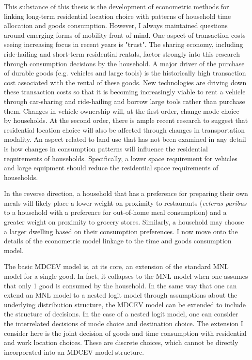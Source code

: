 This substance of this thesis is the development of econometric methods for linking long-term residential location choice with patterns of household time allocation and goods consumption. However, I always maintained questions around emerging forms of mobility front of mind. One aspect of transaction costs seeing increasing focus in recent years is "trust". The sharing economy, including ride-hailing and short-term residential rentals, factor strongly into this research through consumption decisions by the household. A major driver of the purchase of durable goods (e.g. vehicles and large tools) is the historically high transaction cost associated with the rental of these goods. New technologies are driving down these transaction costs so that it is becoming increasingly viable to rent a vehicle through car-sharing and ride-hailing and borrow large tools rather than purchase them. Changes in vehicle ownership will, at the first order, change mode choice by households. At the second order, there is ample recent research to suggest that residential location choice will also be affected through changes in transportation modality. An aspect related to land use that has not been examined in any detail is how changes in consumption patterns will influence the residential requirements of households. Specifically, a lower space requirement for vehicles and large equipment should reduce the residential space requirements of households.

In the reverse direction, a household that has a preference for preparing their own meals will likely place a lower weight on proximity to restaurants (\textit{ceterus paribus} to a household with a preference for out-of-home meal consumption) and a greater weight on proximity to grocery stores. Similarly, a household may choose a larger dwelling based on their consumption preferences. I now move onto the details of the econometric model linkage to the time and goods consumption model.

The basic MDCEV model is, at its core, an extension of the standard MNL model for a single good. In fact, it collapses to the MNL model when one assumes that only 1 good is consumed by the household. In the same way that one can extend an MNL model to a nested logit model through assumptions about the underlying distribution structure, the MDCEV model can be extended to include the structure of decisions. In the case of a nested logit model, one can consider the interrelated decisions of mode choice and destination choice. The extension I consider here is the joint decision of goods and time consumption with residential and work location choices. These are discrete choices, which cannot be directly incorporated into an MDCEV model structure. 

